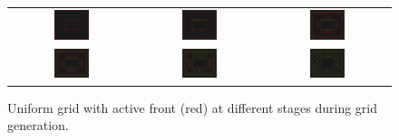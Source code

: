 \documentclass[11pt]{article}
\begin{document}
\begin{figure}[htbp] 
\begin{center}
\begin{tabular}{ccc}
\includegraphics[width = 0.30\textwidth]{front_0.png} & \includegraphics[width = 0.30\textwidth]{front_1a.png} & \includegraphics[width = 0.30\textwidth]{front_2a.png} \\
\includegraphics[width = 0.30\textwidth]{front_3a.png} & \includegraphics[width = 0.30\textwidth]{front_4a.png} &\includegraphics[width = 0.30\textwidth]{front_5a.png} \\
\end{tabular}
\caption{Uniform grid  with active front (red) at different stages during grid generation.}
\label{fig_grida}
\end{center}
\end{figure}
\end{document}
